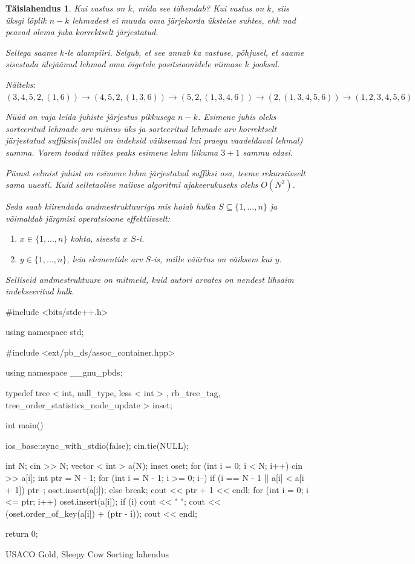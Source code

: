 \documentclass{trkut}
\newtheorem*{solution}{Täislahendus}
\begin{document}
\begin{solution}
Kui vastus on $k$, mida see tähendab? Kui vastus on $k$, siis üksgi lõplik $n-k$ lehmadest ei muuda oma järjekorda üksteise suhtes, ehk nad peavad olema juba korrektselt järjestatud.

Sellega saame $k$-le alampiiri. Selgub, et see annab ka vastuse, põhjusel, et saame sisestada ülejäänud lehmad oma õigetele positsioonidele viimase $k$ jooksul. 

Näiteks: $(3,4,5,2,(1,6))→(4,5,2,(1,3,6))→(5,2,(1,3,4,6))→(2,(1,3,4,5,6))→(1,2,3,4,5,6)$

Nüüd on vaja leida juhiste järjestus pikkusega $n-k$.  Esimene juhis oleks sorteeritud lehmade arv miinus üks ja sorteeritud lehmade arv korrektselt järjestatud suffiksis(millel on indeksid väiksemad kui praegu vaadeldaval lehmal) summa.  Varem toodud näites peaks esimene lehm liikuma $3+1$ sammu edasi.

Pärast eelmist juhist on esimene lehm järjestatud suffiksi osa, teeme rekursiivselt sama uuesti. Kuid selletaolise naiivse algoritmi ajakeerukuseks oleks $O(N^2)$.

Seda saab kiirendada andmestruktuuriga mis hoiab hulka $S\subseteq \{1,...,n\}$ ja võimaldab järgmisi operatsioone effektiivselt: 
\begin{enumerate}
    \item $x\in \{1,...,n\}$ kohta, sisesta $x$ $S$-i.
    \item $y\in \{1,...,n\}$, leia elementide arv $S$-is, mille väärtus on väiksem kui $y$.
\end{enumerate}

Selliseid andmestruktuure on mitmeid, kuid autori arvates on nendest lihsaim indekseeritud hulk.
\end{solution}
\begin{cclol}
#include <bits/stdc++.h>

using namespace std;

#include <ext/pb_ds/assoc_container.hpp>

using namespace __gnu_pbds;

typedef tree < int, null_type, less < int > , 
rb_tree_tag, tree_order_statistics_node_update > inset;

int main() {
  ios_base::sync_with_stdio(false);
  cin.tie(NULL);

  int N;
  cin >> N;
  vector < int > a(N);
  inset oset;
  for (int i = 0; i < N; i++) cin >> a[i];
  int ptr = N - 1;
  for (int i = N - 1; i >= 0; i--) {
    if (i == N - 1 || a[i] < a[i + 1]) {
      ptr--;
      oset.insert(a[i]);
    } else break;
  }
  cout << ptr + 1 << endl;
  for (int i = 0; i <= ptr; i++) {
    oset.insert(a[i]);
    if (i) cout << " ";
    cout << (oset.order_of_key(a[i]) + (ptr - i));
  }
  cout << endl;

  return 0;
}
\end{cclol}
\begin{kk}[H]
    \caption{USACO Gold, Sleepy Cow Sorting lahendus}%
    \end{kk}
\end{document}
